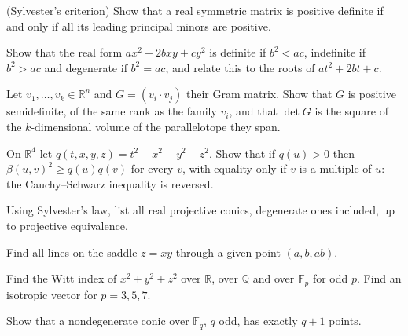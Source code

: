 \begin{exercise}[$\star\star$]\label{geometry:ex:sylvestercrit}
(Sylvester's criterion) Show that a real symmetric matrix is positive definite if and only if all its leading principal minors are positive.
\end{exercise}

\begin{exercise}[$\star$]\label{geometry:ex:binarydisc}
Show that the real form $ax^2+2bxy+cy^2$ is definite if $b^2<ac$, indefinite if $b^2>ac$ and degenerate if $b^2=ac$, and relate this to the roots
of $at^2+2bt+c$.
\end{exercise}

\begin{exercise}[$\star$]\label{geometry:ex:gram}
Let $v_1,\dots,v_k\in\mathbb R^n$ and $G=(v_i\cdot v_j)$ their Gram matrix. Show that $G$ is positive semidefinite, of the same rank as the family $v_i$, and
that $\det G$ is the square of the $k$-dimensional volume of the parallelotope they span.
\end{exercise}

\begin{exercise}[$\star\star$]\label{geometry:ex:lorentz}
On $\mathbb R^4$ let $q(t,x,y,z)=t^2-x^2-y^2-z^2$. Show that if $q(u)>0$ then $\beta(u,v)^2\ge q(u)q(v)$ for every $v$, with equality only if $v$ is a
multiple of $u$: the Cauchy--Schwarz inequality is reversed.
\end{exercise}

\begin{exercise}[$\star$]\label{geometry:ex:conicsclass}
Using Sylvester's law, list all real projective conics, degenerate ones included, up to projective equivalence.
\end{exercise}

\begin{exercise}[$\star$]\label{geometry:ex:saddlelines}
Find all lines on the saddle $z=xy$ through a given point $(a,b,ab)$.
\end{exercise}

\begin{exercise}[$\star$]\label{geometry:ex:wittFp}
Find the Witt index of $x^2+y^2+z^2$ over $\mathbb R$, over $\mathbb Q$ and over $\mathbb F_p$ for odd $p$. Find an isotropic vector for $p=3,5,7$.
\end{exercise}

\begin{exercise}[$\star$]\label{geometry:ex:conicFq}
Show that a nondegenerate conic over $\mathbb F_q$, $q$ odd, has exactly $q+1$ points.
\end{exercise}

